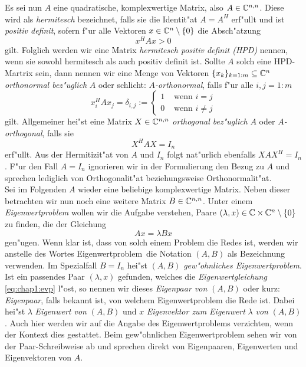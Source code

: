 Es sei nun $A$ eine quadratische, komplexwertige Matrix, also $A\in\mathbb{C}^{n,n}$. Diese wird als \emph{hermitesch} bezeichnet, falls sie die Identit"at $A=A^H$ erf"ullt und ist \emph{positiv definit}, sofern
f"ur alle Vektoren $x\in\mathbb{C}^n \setminus\{0\}$ die Absch"atzung
\[
x^H A x > 0
\]
gilt. Folglich werden wir eine Matrix \emph{hermitesch positiv definit (HPD)}
nennen, wenn sie sowohl hermitesch als auch positiv definit ist. Sollte $A$ solch eine HPD-Martrix sein,
dann nennen wir eine Menge von Vektoren $\{x_k\}_{k=1:m}\subseteq\mathbb{C}^n$ \emph{orthonormal
bez"uglich} $A$ oder schlicht: \emph{$A$-orthonormal}, falls
f"ur alle $i,j = 1:m$
\[
x_i^H A x_j = \delta_{i,j} := \begin{cases}
1 & \text{ wenn } i=j \\
0 & \text{ wenn } i\neq j
\end{cases}
\]
gilt. Allgemeiner hei"st eine Matrix $X\in\mathbb{C}^{n,n}$ \emph{orthogonal bez"uglich} $A$ oder \emph{$A$-orthogonal}, falls sie
\[
X^H A X = I_n
\]
erf"ullt. Aus der Hermitizit"at von $A$ und $I_n$ folgt nat"urlich ebenfalls $XAX^H = I_n$. F"ur den Fall $A=I_n$ ignorieren wir in der Formulierung den Bezug zu $A$ und sprechen lediglich von Orthogonalit"at beziehungsweise Orthonormalit"at.\\

Sei im Folgenden $A$ wieder eine beliebige komplexwertige Matrix. Neben dieser betrachten wir nun noch eine weitere Matrix $B\in\mathbb{C}^{n,n}$.
Unter einem \emph{Eigenwertproblem} wollen wir die Aufgabe verstehen, Paare $(\lambda,x)\in\mathbb{C}\times\mathbb{C}^n \setminus\{0\}$ zu finden, die der Gleichung
\begin{equation}\label{eq:chap1:evp}
Ax = \lambda Bx
\end{equation}
gen"ugen. Wenn klar ist, dass von solch einem Problem die Redes ist, werden wir anstelle des Wortes \glqq Eigenwertproblem\grqq\ die Notation $(A,B)$ als Bezeichnung verwenden. Im Spezialfall $B=I_n$
hei"st $(A,B)$ \emph{gew"ohnliches Eigenwertproblem}.\\

Ist ein passendes Paar $(\lambda,x)$ gefunden, welches die \emph{Eigenwertgleichung} \eqref{eq:chap1:evp} l"ost, so nennen wir dieses \emph{Eigenpaar von} $(A,B)$ oder kurz: \emph{Eigenpaar}, falls bekannt ist, von welchem Eigenwertproblem die Rede ist.
Dabei hei"st $\lambda$ \emph{Eigenwert von} $(A,B)$ und $x$ \emph{Eigenvektor zum Eigenwert} $\lambda$ \emph{von} $(A,B)$. Auch hier werden wir auf die Angabe des Eigenwertproblems verzichten, wenn der Kontext dies gestattet.
Beim gew"ohnlichen Eigenwertproblem sehen wir von der Paar-Schreibweise ab und sprechen direkt von Eigenpaaren, Eigenwerten und Eigenvektoren von $A$.\\

